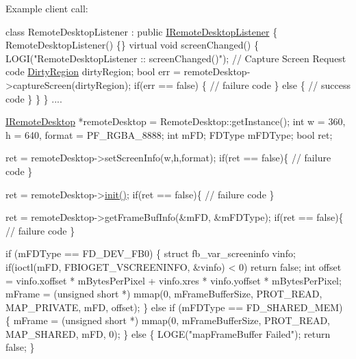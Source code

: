 \-Example client call\-:


\begin{DoxyPre}
 class RemoteDesktopListener : public \hyperlink{classknoxremotedesktop_1_1IRemoteDesktopListener}{IRemoteDesktopListener} \{
 	 RemoteDesktopListener() \{\}
 	 virtual void screenChanged() \{
 		 LOGI("RemoteDesktopListener :: screenChanged()");
		   	 // Capture Screen Request code
			 \hyperlink{classknoxremotedesktop_1_1DirtyRegion}{DirtyRegion} dirtyRegion;
			 bool err = remoteDesktop->captureScreen(dirtyRegion);
			 if(err == false)  \{
				 // failure code
			\} else \{
				 // success code
			\}
		  \}
	   \}
	 ....\end{DoxyPre}



\begin{DoxyPre}	 \hyperlink{classknoxremotedesktop_1_1IRemoteDesktop}{IRemoteDesktop} *remoteDesktop = RemoteDesktop::getInstance();
	 int w = 360, h = 640, format = PF\_RGBA\_8888;
	 int	  mFD;
	 FDType   mFDType;
	 bool ret;\end{DoxyPre}



\begin{DoxyPre}	 ret = remoteDesktop->setScreenInfo(w,h,format);
	 if(ret == false)\{
		 // failure code
	 \}\end{DoxyPre}



\begin{DoxyPre}	 ret = remoteDesktop->\hyperlink{classknoxremotedesktop_1_1IRemoteDesktop_a7bed40d98c61713a69cf1dad8b37beae}{init()};
	 if(ret == false)\{
		 // failure code
	 \}\end{DoxyPre}



\begin{DoxyPre}	 ret = remoteDesktop->getFrameBufInfo(&mFD, &mFDType);
	 if(ret == false)\{
		 // failure code
	 \}\end{DoxyPre}



\begin{DoxyPre}	 if (mFDType == FD\_DEV\_FB0) \{
		 struct fb\_var\_screeninfo vinfo;
		 if(ioctl(mFD, FBIOGET\_VSCREENINFO, &vinfo) < 0) return false;
		 int offset = vinfo.xoffset * mBytesPerPixel + vinfo.xres * vinfo.yoffset * mBytesPerPixel;
		 mFrame = (unsigned short *) mmap(0, mFrameBufferSize, PROT\_READ, MAP\_PRIVATE, mFD, offset);
	 \} else if (mFDType == FD\_SHARED\_MEM) \{
		 mFrame = (unsigned short *) mmap(0, mFrameBufferSize, PROT\_READ, MAP\_SHARED, mFD, 0);
	 \} else \{
		 LOGE("mapFrameBuffer Failed");
		 return false;
	 \}\end{DoxyPre}



